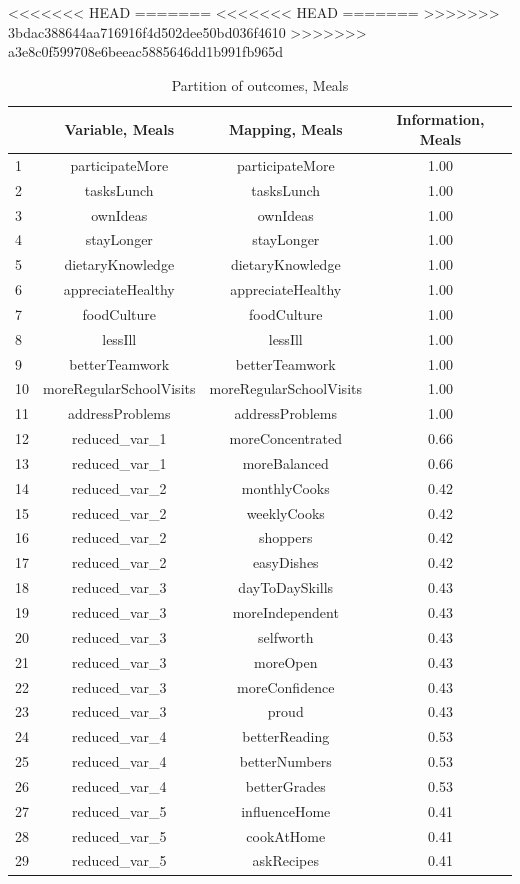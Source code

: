 \documentclass[12pt, a4paper, titlepage]{article}\usepackage[]{graphicx}\usepackage[]{color}
\begin{document}
<<<<<<< HEAD
=======
<<<<<<< HEAD
=======
>>>>>>> 3bdac388644aa716916f4d502dee50bd036f4610
>>>>>>> a3e8c0f599708e6beeac5885646dd1b991fb965d
\begin{table}[ht]
\centering
\begin{tabular}{lccc}
  \hline
 & Variable, Meals & Mapping, Meals & Information, Meals \\ 
  \hline
1 & participateMore & participateMore & 1.00 \\ 
  2 & tasksLunch & tasksLunch & 1.00 \\ 
  3 & ownIdeas & ownIdeas & 1.00 \\ 
  4 & stayLonger & stayLonger & 1.00 \\ 
  5 & dietaryKnowledge & dietaryKnowledge & 1.00 \\ 
  6 & appreciateHealthy & appreciateHealthy & 1.00 \\ 
  7 & foodCulture & foodCulture & 1.00 \\ 
  8 & lessIll & lessIll & 1.00 \\ 
  9 & betterTeamwork & betterTeamwork & 1.00 \\ 
  10 & moreRegularSchoolVisits & moreRegularSchoolVisits & 1.00 \\ 
  11 & addressProblems & addressProblems & 1.00 \\ 
  12 & reduced\_var\_1 & moreConcentrated & 0.66 \\ 
  13 & reduced\_var\_1 & moreBalanced & 0.66 \\ 
  14 & reduced\_var\_2 & monthlyCooks & 0.42 \\ 
  15 & reduced\_var\_2 & weeklyCooks & 0.42 \\ 
  16 & reduced\_var\_2 & shoppers & 0.42 \\ 
  17 & reduced\_var\_2 & easyDishes & 0.42 \\ 
  18 & reduced\_var\_3 & dayToDaySkills & 0.43 \\ 
  19 & reduced\_var\_3 & moreIndependent & 0.43 \\ 
  20 & reduced\_var\_3 & selfworth & 0.43 \\ 
  21 & reduced\_var\_3 & moreOpen & 0.43 \\ 
  22 & reduced\_var\_3 & moreConfidence & 0.43 \\ 
  23 & reduced\_var\_3 & proud & 0.43 \\ 
  24 & reduced\_var\_4 & betterReading & 0.53 \\ 
  25 & reduced\_var\_4 & betterNumbers & 0.53 \\ 
  26 & reduced\_var\_4 & betterGrades & 0.53 \\ 
  27 & reduced\_var\_5 & influenceHome & 0.41 \\ 
  28 & reduced\_var\_5 & cookAtHome & 0.41 \\ 
  29 & reduced\_var\_5 & askRecipes & 0.41 \\ 
   \hline
\end{tabular}
\caption{Partition of outcomes, Meals} 
\label{partitionmeals}
\end{table}
\end{document}
